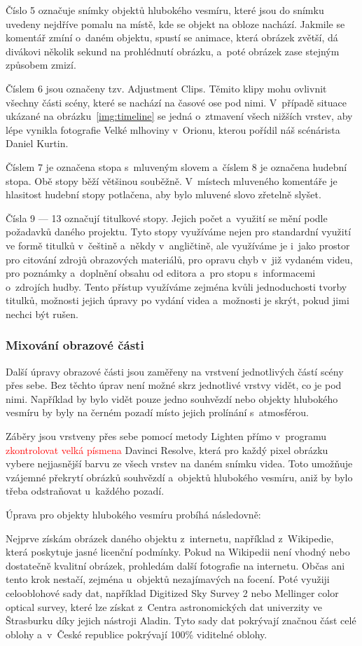 \documentclass[12pt,a4paper,titlepage]{article}
\begin{document}
Číslo 5 označuje snímky objektů hlubokého vesmíru, které jsou do snímku uvedeny nejdříve pomalu na místě, kde se objekt na obloze nachází. Jakmile se komentář zmíní o~daném objektu, spustí se animace, která obrázek zvětší, dá divákovi několik sekund na prohlédnutí obrázku, a~poté obrázek zase stejným způsobem zmizí.

Číslem 6 jsou označeny tzv. Adjustment Clips. Těmito klipy mohu ovlivnit všechny části scény, které se nachází na časové ose pod nimi. V~případě situace ukázané na obrázku~\ref{img:timeline} se jedná o~ztmavení všech nižších vrstev, aby lépe vynikla fotografie Velké mlhoviny v~Orionu, kterou pořídil náš scénárista Daniel Kurtin.

Číslem 7 je označena stopa s~mluveným slovem a~číslem 8 je označena hudební stopa. Obě stopy běží většinou souběžně. V~místech mluveného komentáře je hlasitost hudební stopy potlačena, aby bylo mluvené slovo zřetelně slyšet.

Čísla 9 --- 13 označují titulkové stopy. Jejich počet a~využití se mění podle požadavků daného projektu. Tyto stopy využíváme nejen pro standardní využití ve formě titulků v~češtině a~někdy v~angličtině, ale využíváme je i~jako prostor pro citování zdrojů obrazových materiálů, pro opravu chyb v~již vydaném videu, pro poznámky a~doplnění obsahu od editora a~pro stopu s~informacemi o~zdrojích hudby. Tento přístup využíváme zejména kvůli jednoduchosti tvorby titulků, možnosti jejich úpravy po vydání videa a~možnosti je skrýt, pokud jimi nechci být rušen. 
\subsubsection{Mixování obrazové části}
Další úpravy obrazové části jsou zaměřeny na vrstvení jednotlivých částí scény přes sebe. Bez těchto úprav není možné skrz jednotlivé vrstvy vidět, co je pod nimi. Například by bylo vidět pouze jedno souhvězdí nebo objekty hlubokého vesmíru by byly na černém pozadí místo jejich prolínání s~atmosférou.

Záběry jsou vrstveny přes sebe pomocí metody Lighten přímo v~programu \textcolor{red}{zkontrolovat velká písmena} Davinci Resolve, která pro každý pixel obrázku vybere nejjasnější barvu ze všech vrstev na daném snímku videa. Toto umožňuje vzájemné překrytí obrázků souhvězdí a~objektů hlubokého vesmíru, aniž by bylo třeba odstraňovat u~každého pozadí. 

Úprava pro objekty hlubokého vesmíru probíhá následovně:

Nejprve získám obrázek daného objektu z~internetu, například z~Wikipedie, která poskytuje jasné licenční podmínky. Pokud na Wikipedii není vhodný nebo dostatečně kvalitní obrázek, prohledám další fotografie na internetu. Občas ani tento krok nestačí, zejména u~objektů nezajímavých na focení. Poté využiji celooblohové sady dat, například Digitized Sky Survey 2 nebo Mellinger color optical survey, které lze získat z~Centra astronomických dat univerzity ve Štrasburku díky jejich nástroji Aladin. Tyto sady dat pokrývají značnou část celé oblohy a~v~České republice pokrývají 100\% viditelné oblohy. 
\end{document}
